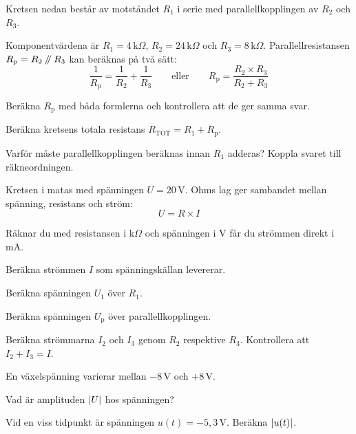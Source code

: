 Kretsen nedan består av motståndet $R_1$ i serie med parallellkopplingen av $R_2$ och $R_3$.


Komponentvärdena är $R_1 = 4\,\text{k}\Omega$, $R_2 = 24\,\text{k}\Omega$ och
$R_3 = 8\,\text{k}\Omega$. Parallellresistansen $R_{\text{p}} = R_2 \mathbin{/\mkern-5mu/} R_3$ kan beräknas på
två sätt:
\[
  \frac{1}{R_{\text{p}}} = \frac{1}{R_2} + \frac{1}{R_3}
  \qquad \text{eller} \qquad
  R_{\text{p}} = \frac{R_2 \times R_3}{R_2 + R_3}
\]
\begin{parts}
  \item Beräkna $R_{\text{p}}$ med båda formlerna och kontrollera att de ger samma svar.
  \item Beräkna kretsens totala resistans $R_{\text{TOT}} = R_1 + R_{\text{p}}$.
  \item Varför måste parallellkopplingen beräknas innan $R_1$ adderas? Koppla svaret till
    räkneordningen.
\end{parts}

Kretsen i  matas med spänningen $U = 20\,\text{V}$. Ohms lag ger sambandet mellan
spänning, resistans och ström:
\[
  U = R \times I
\]

\begin{aside}
\note[Tips] Räknar du med resistansen i k$\Omega$ och spänningen i V får du strömmen direkt i mA.
\end{aside}

\begin{parts}
  \item Beräkna strömmen $I$ som spänningskällan levererar.
  \item Beräkna spänningen $U_1$ över $R_1$.
  \item Beräkna spänningen $U_{\text{p}}$ över parallellkopplingen.
  \item Beräkna strömmarna $I_2$ och $I_3$ genom $R_2$ respektive $R_3$. Kontrollera att
    $I_2 + I_3 = I$.
\end{parts}

En växelspänning varierar mellan $-8\,\text{V}$ och $+8\,\text{V}$.
\begin{parts}
  \item Vad är amplituden $\lvert U\rvert$ hos spänningen?
  \item Vid en viss tidpunkt är spänningen $u(t) = -5{,}3\,\text{V}$. Beräkna $\lvert u(t)\rvert$.
\end{parts}

